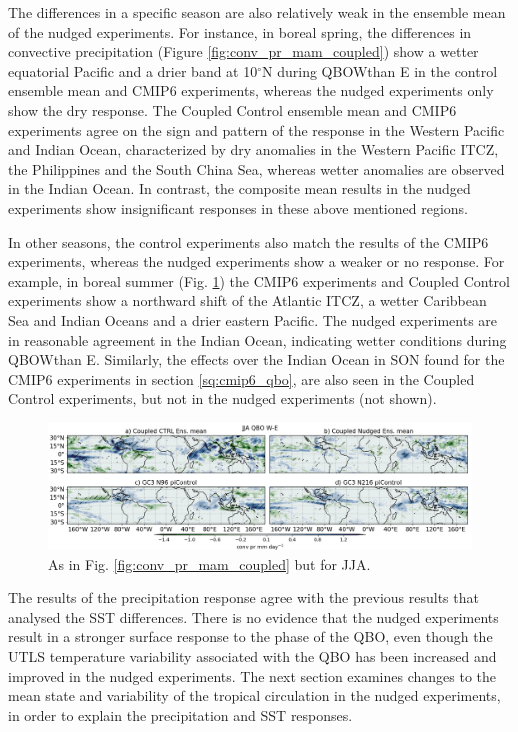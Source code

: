 The differences in a specific season are also relatively weak in the ensemble mean of the nudged experiments. 
For instance, in boreal spring, the differences in convective precipitation (Figure \ref{fig:conv_pr_mam_coupled}) show a wetter equatorial Pacific and a drier band at 10$^\circ$N during QBOWthan E in the control ensemble mean and CMIP6 experiments, whereas the nudged experiments only show the dry response. The Coupled Control ensemble mean and CMIP6 experiments agree on the sign and pattern of the response in the Western Pacific and Indian Ocean, characterized by dry anomalies in the Western Pacific ITCZ, the Philippines and the South China Sea, whereas wetter anomalies are observed in the Indian Ocean. 
In contrast, the composite mean results in the nudged experiments show insignificant responses in these above mentioned regions. 



In other seasons, the control experiments also match the results of the CMIP6 experiments, whereas the nudged experiments show a weaker or no response. For example, in boreal summer (Fig. \ref{fig:conv_pr_jja_coupled}) the CMIP6 experiments and Coupled Control experiments show a northward shift of the Atlantic ITCZ, a wetter Caribbean Sea and Indian Oceans and a drier eastern Pacific. The nudged experiments are in reasonable agreement in the Indian Ocean, indicating wetter conditions during QBOWthan E.
Similarly, the effects over the Indian Ocean in SON found for the CMIP6 experiments in section \ref{sq:cmip6_qbo}, are also seen in the Coupled Control experiments, but not in the nudged experiments (not shown).


\begin{figure}[t!]
\centering
 \includegraphics[width=\linewidth]{figures/conv_prseasonal_jjaqbowqboe.png}
\caption[ Convective precipitation response in JJA]{As in Fig. \ref{fig:conv_pr_mam_coupled} but for JJA.}
\label{fig:conv_pr_jja_coupled}
\end{figure}

The results of the precipitation response agree with the previous results that analysed the SST differences. There is no evidence that the nudged experiments result in a stronger surface response to the phase of the QBO, even though the UTLS temperature variability associated with the QBO has been increased and improved in the nudged experiments. 
The next section examines changes to the mean state and variability of the tropical circulation in the nudged experiments, in order to explain the precipitation and SST responses.

